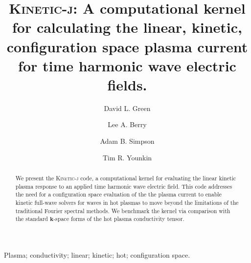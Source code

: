 \documentclass[final,5p,times,twocolumn]{elsarticle}
\renewcommand{\vec}[1]{\mathbf{#1}}
\newcommand{\kj}{\textsc{Kinetic-j}\xspace}
\begin{document}
\begin{frontmatter}



\title{\kj: A computational kernel for calculating the linear, kinetic, configuration space plasma current for time harmonic wave electric fields.}


\author[a]{David L. Green}
\author[a,b]{Lee A. Berry}
\author[b]{Adam B. Simpson}
\author[b,c]{Tim R. Younkin}

\address[a]{Oak Ridge National Laboratory, 1 Bethel Valley Rd., Oak Ridge, Tennessee 37831, USA}
\address[b]{XCEL Engineering, 1066 Commerce Park Dr., Oak Ridge, Tennessee 37830, USA}
\address[c]{Universtity of Tennessee, Knoxville, Tennessee 37996, USA}

\begin{abstract}
We present the \kj code, a computational kernel for evaluating the linear kinetic plasma response to an applied time harmonic wave electric field. This code addresses the need for a configuration space evaluation of the the plasma current to enable kinetic full-wave solvers for waves in hot plasmas to move beyond the limitations of the traditional Fourier spectral methods. We benchmark the kernel via comparison with the standard $\vec{k}$-space forms of the hot plasma conductivity tensor. 
\end{abstract}

\begin{keyword}
Plasma; conductivity; linear; kinetic; hot; configuration space.

\end{keyword}

\end{frontmatter}
\end{document}
